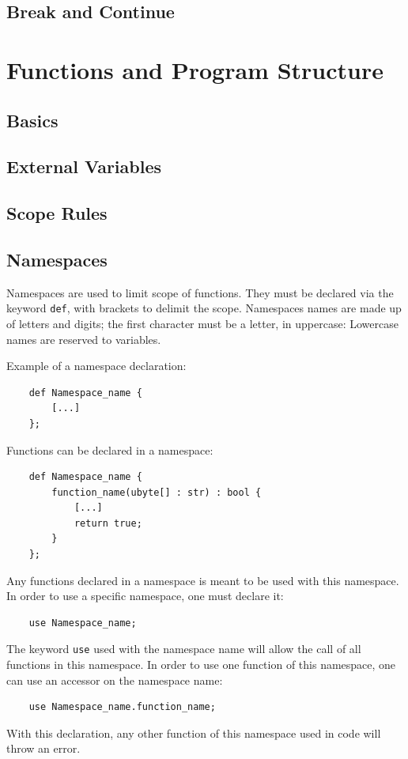 \documentclass{scrartcl}
\begin{document}
        \subsection{Break and Continue}
    \section{Functions and Program Structure}
        \subsection{Basics}
        \subsection{External Variables}
        \subsection{Scope Rules}
        \subsection{Namespaces} \label{namespaces}
            Namespaces are used to limit scope of functions. They must be declared
            via the keyword \texttt{def}, with brackets to delimit the scope.
            Namespaces names are made up of letters and digits; the first character
            must be a letter, in uppercase: Lowercase names are reserved to variables.

            Example of a namespace declaration:
            \begin{lstlisting}
    def Namespace_name {
        [...]
    };
            \end{lstlisting}
            Functions can be declared in a namespace:
            \begin{lstlisting}
    def Namespace_name {
        function_name(ubyte[] : str) : bool {
            [...]
            return true;
        }
    };
            \end{lstlisting}
            Any functions declared in a namespace is meant to be used with this
            namespace. In order to use a specific namespace, one must declare it:
            \begin{lstlisting}
    use Namespace_name;
            \end{lstlisting}
            The keyword \texttt{use} used with the namespace name will allow
            the call of all functions in this namespace. In order to use one
            function of this namespace, one can use an accessor on the namespace name:
            \begin{lstlisting}
    use Namespace_name.function_name;
            \end{lstlisting}
            With this declaration, any other function of this namespace used in
            code will throw an error.
\end{document}
